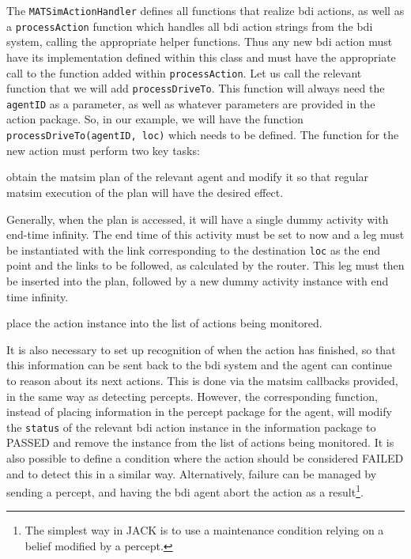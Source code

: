 The \lstinline{MATSimActionHandler} defines all functions that
realize \gls{bdi} actions, as well as a \lstinline{processAction} function
which handles all \gls{bdi} action strings from the \gls{bdi} system,
calling the appropriate helper functions. Thus any new \gls{bdi} action must have
its implementation defined within this class and must have the appropriate
call to the function added within \lstinline{processAction}.  Let us call
the relevant function that we will add \lstinline{processDriveTo}. This function
will always need the \lstinline{agentID} as a parameter, as well as
whatever parameters are provided in the action package. So, in our
example, we will have the function \lstinline{processDriveTo(agentID, loc)}
which needs to be defined. 
%
The function for the new action must perform two key tasks:
\begin{tightenumerate}
\item obtain the \gls{matsim} plan of the relevant agent and modify it so
  that regular \gls{matsim} execution of the plan will have the desired
  effect.

Generally, when the plan is accessed, it will have a single dummy
activity with end-time infinity. The end time of this activity must be
set to now and a leg must be instantiated with the link corresponding
to the destination \lstinline{loc} as the end point and the links to be
followed, as calculated by the router. This leg must then be inserted
into the plan, followed by a new dummy activity instance with end time
infinity. 

\item place the action instance into the list of actions being
  monitored. 
\end{tightenumerate}

It is also necessary to set up recognition of when the action has
finished, so that this information can be sent back to the \gls{bdi} system
and the agent can continue to reason about its next actions.  This is
done via the \gls{matsim} callbacks provided, in the same way as 
detecting percepts. However, the corresponding function, instead of
placing information in the percept package for the agent, will modify
the \lstinline{status} of the relevant \gls{bdi} action instance in the
information package to PASSED and remove the instance from the list
of actions being monitored. It is also possible to define a condition
where the action should be considered FAILED
and to detect this in a similar way. Alternatively, failure can be
managed by sending a percept, and having the \gls{bdi} agent abort the
action as a result\footnote{The simplest way in JACK is to use a
  maintenance condition relying on a belief modified 
by a percept.}.


